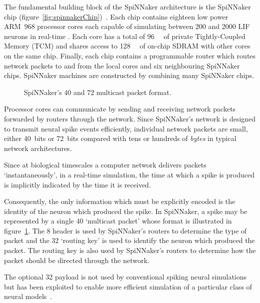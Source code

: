 		The fundamental building block of the SpiNNaker architecture is the
		SpiNNaker chip (figure~\ref{fig:spinnakerChip})~\cite{furber13}. Each chip
		contains eighteen low power ARM~968 processor cores each capable of
		simulating between \num{200} and \num{2000} LIF neurons in real-time
		\cite{mundy15}.  Each core has a total of \SI{96}{\kilo\byte} of private
		Tightly-Coupled Memory (TCM) and shares access to \SI{128}{\mega\byte} of
		on-chip SDRAM with other cores on the same chip. Finally, each chip
		contains a programmable router which routes network packets to and from the
		local cores and six neighbouring SpiNNaker chips. SpiNNaker machines are
		constructed by combining many SpiNNaker chips.
		
		\begin{figure}
			\center
			
			\caption{SpiNNaker's \SI{40}{\bit} and \SI{72}{\bit} multicast packet
			format.}
			\label{fig:spinnaker-packet}
		\end{figure}
		
		Processor cores can communicate by sending and receiving network packets
		forwarded by routers through the network. Since SpiNNaker's network is
		designed to transmit neural spike events efficiently, individual network
		packets are small, either 40~bits or 72~bits compared with tens or hundreds
		of \emph{bytes} in typical network architectures.
		
		Since at biological
		timescales a computer network delivers packets `instantaneously',
		in a real-time simulation, the time at which a spike is produced is
		implicitly indicated by the time it is received.
		
		Consequently, the only information which must be explicitly encoded is the
		identity of the neuron which produced the spike. In SpiNNaker, a spike may
		be represented by a single \SI{40}{\bit} `multicast packet' whose format is
		illustrated in figure~\ref{fig:spinnaker-packet}.  The \SI{8}{\bit} header
		is used by SpiNNaker's routers to determine the type of packet and the
		\SI{32}{\bit} `routing key' is used to identify the neuron which produced
		the packet. The routing key is also used by SpiNNaker's routers to
		determine how the packet should be directed through the network.
		
		The optional \SI{32}{\bit} payload is not used by conventional spiking
		neural simulations~\cite{galluppi10} but has been exploited to enable more
		efficient simulation of a particular class of neural models~\cite{mundy15}.
	

